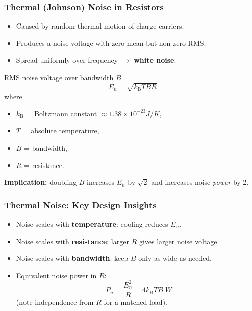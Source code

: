 \begin{frame}
	\frametitle{Thermal (Johnson) Noise in Resistors}
	\begin{itemize}
		\item Caused by random thermal motion of charge carriers.
		\item Produces a noise voltage with zero mean but non-zero RMS.
		\item Spread uniformly over frequency \(\rightarrow\) \textbf{white noise}.
	\end{itemize}
	\begin{block}{RMS noise voltage over bandwidth $B$}
		\begin{equation}
			\boxed{E_n = \sqrt{k_{\mathrm{B}} T B R}}
		\end{equation}
		where
		\begin{itemize}
			\item $k_{\mathrm{B}}$ = Boltzmann constant $\approx 1.38\times10^{-23}\unit{J/K}$,
			\item $T$ = absolute temperature,
			\item $B$ = bandwidth,
			\item $R$ = resistance.
		\end{itemize}
	\end{block}
	\textbf{Implication:} doubling $B$ increases $E_n$ by $\sqrt{2}$ and increases noise \emph{power} by 2.
\end{frame}

\begin{frame}
	\frametitle{Thermal Noise: Key Design Insights}
	\begin{itemize}
		\item Noise scales with \textbf{temperature}: cooling reduces $E_n$.
		\item Noise scales with \textbf{resistance}: larger $R$ gives larger noise voltage.
		\item Noise scales with \textbf{bandwidth}: keep $B$ only as wide as needed.
		\item Equivalent noise power in $R$:
		\begin{equation}
			P_n = \frac{E_n^2}{R} = 4k_{\mathrm{B}} T B \;\unit{W}
		\end{equation}
		(note independence from $R$ for a matched load).
	\end{itemize}
\end{frame}

